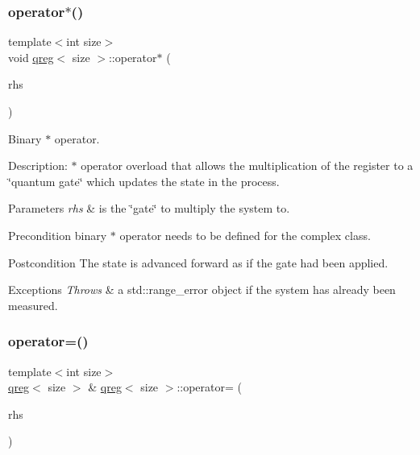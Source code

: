 \subsubsection{\texorpdfstring{operator$\ast$()}{operator*()}}
{\footnotesize\ttfamily template$<$int size$>$ \\
void \hyperlink{classqreg}{qreg}$<$ size $>$\+::operator$\ast$ (\begin{DoxyParamCaption}\item[{const \hyperlink{classnTrix}{n\+Trix}$<$ \hyperlink{gatedata_8h_a0c9667bfe3ded0fa2cd4fab281edbe24}{cpf} $>$ \&}]{rhs }\end{DoxyParamCaption})}



Binary $\ast$ operator. 

Description\+: $\ast$ operator overload that allows the multiplication of the register to a \char`\"{}quantum gate\char`\"{} which updates the state in the process. 
\begin{DoxyParams}{Parameters}
{\em rhs} & is the \char`\"{}gate\char`\"{} to multiply the system to. \\
\hline
\end{DoxyParams}
\begin{DoxyPrecond}{Precondition}
binary $\ast$ operator needs to be defined for the complex class. 
\end{DoxyPrecond}
\begin{DoxyPostcond}{Postcondition}
The state is advanced forward as if the gate had been applied. 
\end{DoxyPostcond}

\begin{DoxyExceptions}{Exceptions}
{\em Throws} & a std\+::range\+\_\+error object if the system has already been measured. \\
\hline
\end{DoxyExceptions}
\mbox{\label{classqreg_a677e4810f14987e619b6b5c9a6a75b4c}} 
\subsubsection{\texorpdfstring{operator=()}{operator=()}}
{\footnotesize\ttfamily template$<$int size$>$ \\
\hyperlink{classqreg}{qreg}$<$ size $>$ \& \hyperlink{classqreg}{qreg}$<$ size $>$\+::operator= (\begin{DoxyParamCaption}\item[{const \hyperlink{classqreg}{qreg}$<$ size $>$ \&}]{rhs }\end{DoxyParamCaption})}



